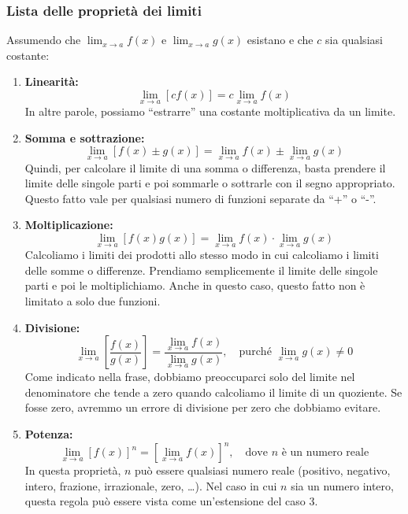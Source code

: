 \documentclass{article}
\begin{document}
\subsubsection{Lista delle proprietà dei limiti}
Assumendo che \(\lim_{x \to a} f(x)\) e \(\lim_{x \to a} g(x)\) esistano e che \(c\) sia
qualsiasi costante:
\begin{enumerate}
    \item \textbf{Linearità:}
    \begin{equation*}
        \lim_{x \to a} [c f(x)] = c \lim_{x \to a} f(x)
    \end{equation*}
    In altre parole, possiamo ``estrarre'' una costante moltiplicativa da un limite.
    
    \item \textbf{Somma e sottrazione:}
    \begin{equation*}
        \lim_{x \to a} [f(x) \pm g(x)] = \lim_{x \to a} f(x) \pm \lim_{x \to a} g(x)
    \end{equation*}
    Quindi, per calcolare il limite di una somma o differenza, basta prendere il limite delle
    singole parti e poi sommarle o sottrarle con il segno appropriato. Questo fatto vale per
    qualsiasi numero di funzioni separate da ``+'' o ``-''.
    
    \item \textbf{Moltiplicazione:}
    \begin{equation*}
        \lim_{x \to a} [f(x) g(x)] = \lim_{x \to a} f(x) \cdot \lim_{x \to a} g(x)
    \end{equation*}
    Calcoliamo i limiti dei prodotti allo stesso modo in cui calcoliamo i limiti delle somme
    o differenze. Prendiamo semplicemente il limite delle singole parti e poi le
    moltiplichiamo. Anche in questo caso, questo fatto non è limitato a solo due funzioni.
    
    \item \textbf{Divisione:}
    \begin{equation*}
        \lim_{x \to a} \left[ \frac{f(x)}{g(x)} \right] = \frac{\lim_{x \to a} f(x)}{\lim_{x \to a} g(x)}, \quad \text{purché } \lim_{x \to a} g(x) \ne 0
    \end{equation*}
    Come indicato nella frase, dobbiamo preoccuparci solo del limite nel denominatore che
    tende a zero quando calcoliamo il limite di un quoziente. Se fosse zero, avremmo un errore
    di divisione per zero che dobbiamo evitare.
    
    \item \textbf{Potenza:}
    \begin{equation*}
        \lim_{x \to a} [f(x)]^n = \left[\lim_{x \to a} f(x)\right]^n, \quad \text{dove } n \text{ è un numero reale}
    \end{equation*}
    In questa proprietà, \(n\) può essere qualsiasi numero reale (positivo, negativo, intero,
    frazione, irrazionale, zero, \dots). Nel caso in cui \(n\) sia un numero intero, questa
    regola può essere vista come un'estensione del caso 3.
    

\end{enumerate}
\end{document}
